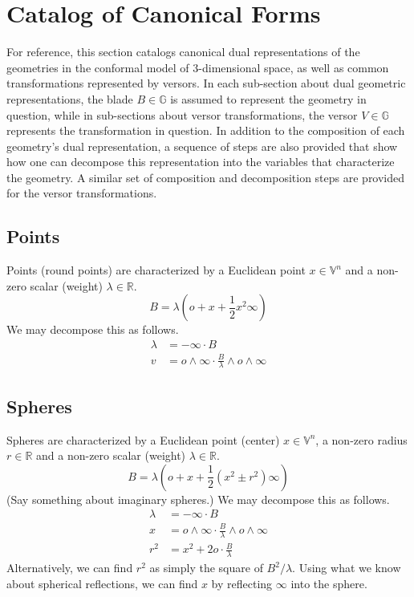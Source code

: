 \documentclass[12pt]{article}
\newcommand{\G}{\mathbb{G}}
\newcommand{\V}{\mathbb{V}}
\newcommand{\R}{\mathbb{R}}
\newcommand{\nvao}{o}
\newcommand{\nvai}{\infty}
\begin{document}

\section{Catalog of Canonical Forms}

For reference, this section catalogs canonical dual representations of the geometries in the
conformal model of 3-dimensional space, as well as common transformations represented
by versors.  In each sub-section about dual geometric representations, the blade $B\in\G$ is
assumed to represent the geometry in question, while in sub-sections about
versor transformations, the versor $V\in\G$ represents the transformation in question.
In addition to the composition
of each geometry's dual representation, a sequence of steps
are also provided that show how one can decompose this representation
into the variables that characterize the geometry.  A similar set of composition
and decomposition steps are provided for the versor transformations.

\subsection{Points}

Points (round points) are characterized by a Euclidean point $x\in\V^n$ and
a non-zero scalar (weight) $\lambda\in\R$.
\begin{equation*}
B = \lambda\left(\nvao + x + \frac{1}{2}x^2\nvai\right)
\end{equation*}
We may decompose this as follows.
\begin{align*}
\lambda &= -\nvai\cdot B \\
v &= \nvao\wedge\nvai\cdot\frac{B}{\lambda}\wedge\nvao\wedge\nvai
\end{align*}

\subsection{Spheres}

Spheres are characterized by a Euclidean point (center) $x\in\V^n$, a
non-zero radius $r\in\R$ and a non-zero scalar (weight) $\lambda\in\R$.
\begin{equation*}
B = \lambda\left(\nvao + x + \frac{1}{2}(x^2\pm r^2)\nvai\right)
\end{equation*}
(Say something about imaginary spheres.)
We may decompose this as follows.
\begin{align*}
\lambda &= -\nvai\cdot B \\
x &= \nvao\wedge\nvai\cdot\frac{B}{\lambda}\wedge\nvao\wedge\nvai \\
r^2 &= x^2 + 2\nvao\cdot\frac{B}{\lambda}
\end{align*}
Alternatively, we can find $r^2$ as simply the square of $B^2/\lambda$.
Using what we know about spherical reflections, we can find $x$ by
reflecting $\nvai$ into the sphere.
\end{document}
